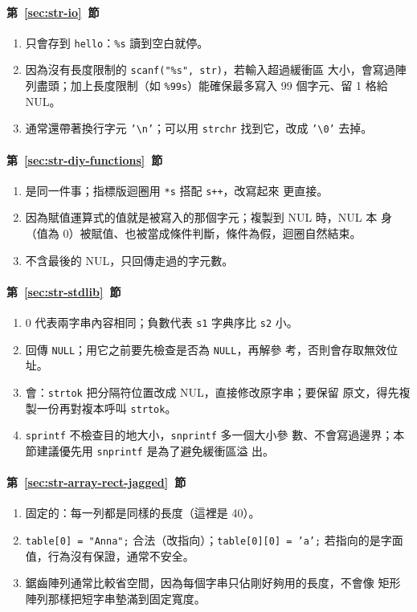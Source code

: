 \paragraph{第~\ref{sec:str-io}~節}
\begin{enumerate}
\item 只會存到 \texttt{hello}：\texttt{\%s} 讀到空白就停。
\item 因為沒有長度限制的 \texttt{scanf("\%s", str)}，若輸入超過緩衝區
大小，會寫過陣列盡頭；加上長度限制（如 \texttt{\%99s}）能確保最多寫入
99 個字元、留 1 格給 NUL。
\item 通常還帶著換行字元 \texttt{'\textbackslash n'}；可以用
\texttt{strchr} 找到它，改成 \texttt{'\textbackslash 0'} 去掉。
\end{enumerate}

\paragraph{第~\ref{sec:str-diy-functions}~節}
\begin{enumerate}
\item 是同一件事；指標版迴圈用 \texttt{*s} 搭配 \texttt{s++}，改寫起來
更直接。
\item 因為賦值運算式的值就是被寫入的那個字元；複製到 NUL 時，NUL 本
身（值為 $0$）被賦值、也被當成條件判斷，條件為假，迴圈自然結束。
\item 不含最後的 NUL，只回傳走過的字元數。
\end{enumerate}

\paragraph{第~\ref{sec:str-stdlib}~節}
\begin{enumerate}
\item $0$ 代表兩字串內容相同；負數代表 \texttt{s1} 字典序比 \texttt{s2}
小。
\item 回傳 \texttt{NULL}；用它之前要先檢查是否為 \texttt{NULL}，再解參
考，否則會存取無效位址。
\item 會：\texttt{strtok} 把分隔符位置改成 NUL，直接修改原字串；要保留
原文，得先複製一份再對複本呼叫 \texttt{strtok}。
\item \texttt{sprintf} 不檢查目的地大小，\texttt{snprintf} 多一個大小參
數、不會寫過邊界；本節建議優先用 \texttt{snprintf} 是為了避免緩衝區溢
出。
\end{enumerate}

\paragraph{第~\ref{sec:str-array-rect-jagged}~節}
\begin{enumerate}
\item 固定的：每一列都是同樣的長度（這裡是 40）。
\item \texttt{table[0] = "Anna";} 合法（改指向）；\texttt{table[0][0] =
'a';} 若指向的是字面值，行為沒有保證，通常不安全。
\item 鋸齒陣列通常比較省空間，因為每個字串只佔剛好夠用的長度，不會像
矩形陣列那樣把短字串墊滿到固定寬度。
\end{enumerate}

